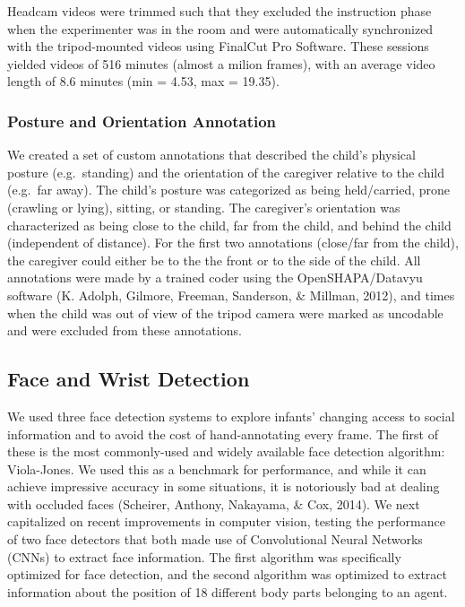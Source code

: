 \documentclass[10pt, letterpaper]{article}
\begin{document}
Headcam videos were trimmed such that they excluded the instruction
phase when the experimenter was in the room and were automatically
synchronized with the tripod-mounted videos using FinalCut Pro Software.
These sessions yielded videos of 516 minutes (almost a milion frames),
with an average video length of 8.6 minutes (min = 4.53, max = 19.35).

\subsubsection{Posture and Orientation
Annotation}\label{posture-and-orientation-annotation}

We created a set of custom annotations that described the child's
physical posture (e.g.~standing) and the orientation of the caregiver
relative to the child (e.g.~far away). The child's posture was
categorized as being held/carried, prone (crawling or lying), sitting,
or standing. The caregiver's orientation was characterized as being
close to the child, far from the child, and behind the child
(independent of distance). For the first two annotations (close/far from
the child), the caregiver could either be to the the front or to the
side of the child. All annotations were made by a trained coder using
the OpenSHAPA/Datavyu software (K. Adolph, Gilmore, Freeman, Sanderson,
\& Millman, 2012), and times when the child was out of view of the
tripod camera were marked as uncodable and were excluded from these
annotations.

\subsection{Face and Wrist Detection}\label{face-and-wrist-detection}

We used three face detection systems to explore infants' changing access
to social information and to avoid the cost of hand-annotating every
frame. The first of these is the most commonly-used and widely available
face detection algorithm: Viola-Jones. We used this as a benchmark for
performance, and while it can achieve impressive accuracy in some
situations, it is notoriously bad at dealing with occluded faces
(Scheirer, Anthony, Nakayama, \& Cox, 2014). We next capitalized on
recent improvements in computer vision, testing the performance of two
face detectors that both made use of Convolutional Neural Networks
(CNNs) to extract face information. The first algorithm was specifically
optimized for face detection, and the second algorithm was optimized to
extract information about the position of 18 different body parts
belonging to an agent.
\end{document}
